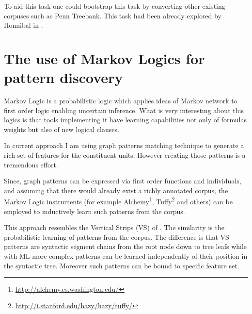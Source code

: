 To aid this task one could bootstrap this task by converting other existing corpuses such as Penn Treebank. This task had been already explored by Honnibal in \citeyear{Honnibal2004a,Honnibal2007}.

\section{The use of Markov Logics for pattern discovery}
Markov Logic \citep{Richardson2006,Domingos2010} is a probabilistic logic which applies ideas of Markov network to first order logic enabling uncertain inference. What is very interesting about this logics is that tools implementing it have learning capabilities not only of formulas weights but also of new logical clauses. 

In current approach I am using graph patterns matching technique to generate a rich set of features for the constituent units. However creating those patterns is a tremendous effort. 

Since, graph patterns can be expressed via first order functions and individuals, and assuming that there would already exist a richly annotated corpus, the Markov Logic instruments (for example Alchemy\footnote{\url{http://alchemy.cs.washington.edu/}}, Tuffy\footnote{\url{http://i.stanford.edu/hazy/hazy/tuffy/}} and others) can be employed to inductively learn such patterns from the corpus. 

This approach resembles the Vertical Strips (VS) of \citet{ODonoghue1991a}. The similarity is the probabilistic learning of patterns from the corpus. The difference is that VS patterns are syntactic segment chains from the root node down to tree leafs while with ML more complex patterns can be learned independently of their position in the syntactic tree. Moreover such patterns can be bound to specific feature set. 

